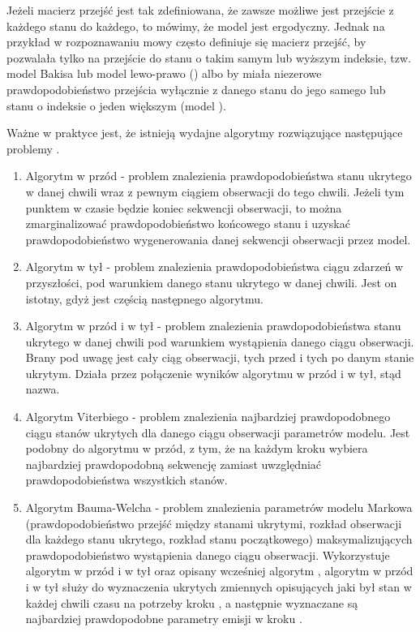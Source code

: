 Jeżeli macierz przejść jest tak zdefiniowana, że zawsze możliwe jest przejście z każdego stanu do każdego, to
mówimy, że model jest ergodyczny. Jednak na przykład w rozpoznawaniu mowy często definiuje się macierz przejść,
by pozwalała tylko na przejście do stanu o takim samym lub wyższym indeksie, tzw. model Bakisa lub model lewo-prawo
() albo by miała niezerowe prawdopodobieństwo przejścia wyłącznie z danego stanu do jego
samego lub stanu o indeksie o jeden większym (model ).

Ważne w praktyce jest, że istnieją wydajne algorytmy rozwiązujące następujące problemy .

\begin{enumerate}
    \item Algorytm w przód - problem znalezienia prawdopodobieństwa stanu ukrytego w danej chwili wraz z pewnym ciągiem obserwacji do tego chwili. Jeżeli tym punktem w czasie będzie koniec sekwencji obserwacji, to można zmarginalizować prawdopodobieństwo końcowego stanu i uzyskać prawdopodobieństwo wygenerowania danej sekwencji obserwacji przez model.
    \item Algorytm w tył - problem znalezienia prawdopodobieństwa ciągu zdarzeń w przyszłości, pod warunkiem danego stanu ukrytego w danej chwili. Jest on istotny, gdyż jest częścią następnego algorytmu.
    \item Algorytm w przód i w tył - problem znalezienia prawdopodobieństwa stanu ukrytego w danej chwili pod warunkiem wystąpienia danego ciągu obserwacji. Brany pod uwagę jest cały ciąg obserwacji, tych przed i tych po danym stanie ukrytym. Działa przez połączenie wyników algorytmu w przód i w tył, stąd nazwa.
    \item Algorytm Viterbiego - problem znalezienia najbardziej prawdopodobnego ciągu stanów ukrytych dla danego ciągu obserwacji parametrów modelu. Jest podobny do algorytmu w przód, z tym, że na każdym kroku wybiera najbardziej prawdopodobną sekwencję zamiast uwzględniać prawdopodobieństwa wszystkich stanów.
    \item Algorytm Bauma-Welcha - problem znalezienia parametrów modelu Markowa (prawdopodobieństwo przejść między stanami ukrytymi, rozkład obserwacji dla każdego stanu ukrytego, rozkład stanu początkowego) maksymalizujących prawdopodobieństwo wystąpienia danego ciągu obserwacji. Wykorzystuje algorytm w przód i w tył oraz opisany wcześniej algorytm , algorytm w przód i w tył służy do wyznaczenia ukrytych zmiennych opisujących jaki był stan w każdej chwili czasu na potrzeby kroku , a następnie wyznaczane są najbardziej prawdopodobne parametry emisji w kroku .
\end{enumerate}


